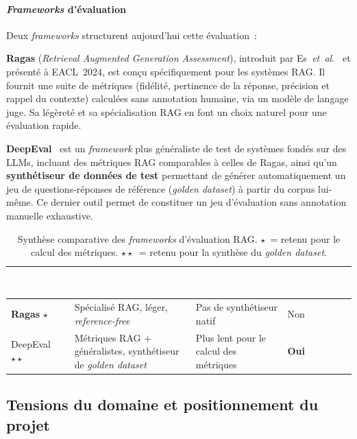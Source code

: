 \documentclass[11pt,a4paper]{article}
\begin{document}
\paragraph{\textit{Frameworks} d'évaluation}

Deux \textit{frameworks} structurent aujourd'hui cette évaluation~:

\textbf{Ragas} (\textit{Retrieval Augmented Generation Assessment}), introduit par Es~\textit{et~al.}~\cite{es2024ragas} et présenté à EACL~2024, est conçu spécifiquement pour les systèmes RAG. Il fournit une suite de métriques (fidélité, pertinence de la réponse, précision et rappel du contexte) calculées sans annotation humaine, via un modèle de langage juge. Sa légèreté et sa spécialisation RAG en font un choix naturel pour une évaluation rapide.

\textbf{DeepEval}~\cite{deepeval2024} est un \textit{framework} plus généraliste de test de systèmes fondés sur des LLMs, incluant des métriques RAG comparables à celles de Ragas, ainsi qu'un \textbf{synthétiseur de données de test} permettant de générer automatiquement un jeu de questions-réponses de référence (\textit{golden dataset}) à partir du corpus lui-même. Ce dernier outil permet de constituer un jeu d'évaluation sans annotation manuelle exhaustive.

\begin{table}[H]
\centering
\small
\begin{tabularx}{\linewidth}{L{2.5cm} L{3.5cm} L{3.5cm} C{3cm}}
\toprule
{}
\textcolor{white}{\textbf{\textit{Framework}}} &
\textcolor{white}{\textbf{Forces}} &
\textcolor{white}{\textbf{Limites}} &
\textcolor{white}{\textbf{Synthèse de données}} \\
\midrule
{}
\textbf{Ragas} $\star$  & Spécialisé RAG, léger, \textit{reference-free}   & Pas de synthétiseur natif        & Non \\
DeepEval $\star\star$ & Métriques RAG + généralistes, synthétiseur de \textit{golden dataset} & Plus lent pour le calcul des métriques & \textbf{Oui} \\
\bottomrule
\end{tabularx}
\caption{Synthèse comparative des \textit{frameworks} d'évaluation RAG. $\star$~= retenu pour le calcul des métriques. $\star\star$~= retenu pour la synthèse du \textit{golden dataset}.}
\label{tab:eval}
\end{table}

\subsection{Tensions du domaine et positionnement du projet}
\label{sec:tensions}
\end{document}

